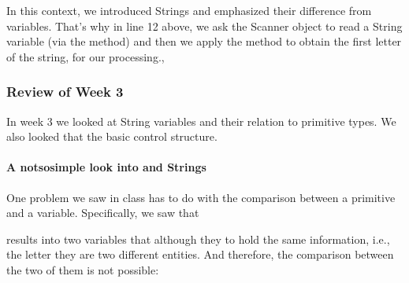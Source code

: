\documentclass[letterpaper,10pt,english]{sphinxmanual}
\begin{document}
In this context, we introduced Strings and emphasized their difference from  variables. That’s why in line 12 above, we ask the Scanner object to read a String variable (via the  method) and then we apply the  method to obtain the first letter of the string, for our processing.,


\subsubsection{Review of Week 3}
\label{\detokenize{COMP170/2020Spring/week3:review-of-week-3}}\label{\detokenize{COMP170/2020Spring/week3::doc}}
In week 3 we looked at String variables and their relation to  primitive types. We also looked that the basic  control structure.


\paragraph{A not\sphinxhyphen{}so\sphinxhyphen{}simple look into  and Strings}
\label{\detokenize{COMP170/2020Spring/week3:a-not-so-simple-look-into-char-and-strings}}
One problem we saw in class has to do with the comparison between a  primitive and a  variable. Specifically, we saw that

\begin{sphinxVerbatim}[commandchars=\\\{\},numbers=left,firstnumber=1,stepnumber=1]
   
   
\end{sphinxVerbatim}

results into two variables that although they  to hold the same information, i.e., the letter  they are two different entities. And therefore, the comparison between the two of them is not possible:

\begin{sphinxVerbatim}[commandchars=\\\{\}]
      
\end{sphinxVerbatim}
\end{document}
